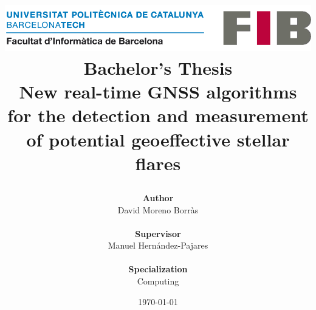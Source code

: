 \title{
	{
	\includegraphics[width=0.7\linewidth]{images/cover/logo-fib.png}	
	\vspace{1cm} \\
	\textbf{Bachelor's Thesis} \\
	\large New real-time GNSS algorithms for the detection and measurement of potential geoeffective stellar flares}
\author{\textbf{Author}\\
	David Moreno Borr\`as
	\\ \\
	\textbf{Supervisor}\\
	Manuel Hernández-Pajares
	\\ \\
	\textbf{Specialization}\\
	Computing
} 
	\vspace{1.3cm}
\date{\today}
}
\maketitle
\thispagestyle{empty}